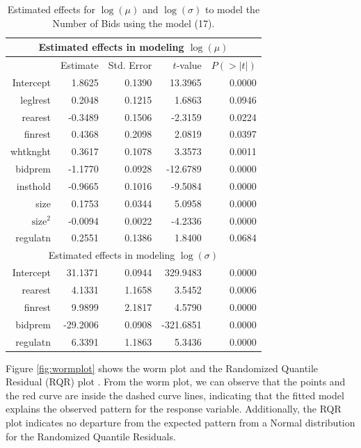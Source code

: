 \begin{table}[h]
\centering
\begin{tabular}{rrrrr} \hline
 \multicolumn{5}{c}{Estimated effects in modeling $\log(\mu)$}\\ \hline
 & Estimate & Std. Error & $t$-value & $P(>|t|)$ \\ \hline
Intercept & 1.8625 & 0.1390 & 13.3965 & 0.0000 \\ 
  leglrest & 0.2048 & 0.1215 & 1.6863 & 0.0946 \\ 
  rearest & -0.3489 & 0.1506 & -2.3159 & 0.0224 \\ 
  finrest & 0.4368 & 0.2098 & 2.0819 & 0.0397 \\ 
  whtknght & 0.3617 & 0.1078 & 3.3573 & 0.0011 \\ 
  bidprem & -1.1770 & 0.0928 & -12.6789 & 0.0000 \\ 
  insthold & -0.9665 & 0.1016 & -9.5084 & 0.0000 \\ 
  size & 0.1753 & 0.0344 & 5.0958 & 0.0000 \\ 
  $\text{size}^2$ & -0.0094 & 0.0022 & -4.2336 & 0.0000 \\ 
  regulatn & 0.2551 & 0.1386 & 1.8400 & 0.0684 \\ \hline
  \multicolumn{5}{c}{Estimated effects in modeling $\log(\sigma)$}\\ \hline
  Intercept & 31.1371 & 0.0944 & 329.9483 & 0.0000 \\ 
  rearest & 4.1331 & 1.1658 & 3.5452 & 0.0006 \\ 
  finrest & 9.9899 & 2.1817 & 4.5790 & 0.0000 \\ 
  bidprem & -29.2006 & 0.0908 & -321.6851 & 0.0000 \\ 
  regulatn & 6.3391 & 1.1863 & 5.3436 & 0.0000 \\ 
  \hline
\end{tabular}
\caption{Estimated effects for $\log(\mu)$ and $\log(\sigma)$ to model the Number of Bids using the model (17).}\label{table:res_numbids}
\end{table}

Figure \ref{fig:wormplot} shows the worm plot and the Randomized Quantile Residual (RQR) plot \citep{wormplot_2001}. From the worm plot, we can observe that the points and the red curve are inside the dashed curve lines, indicating that the fitted model explains the observed pattern for the response variable. Additionally, the RQR plot indicates no departure from the expected pattern from a Normal distribution for the Randomized Quantile Residuals.

